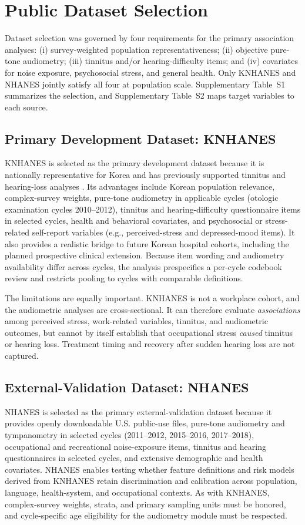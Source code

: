 \section{Public Dataset Selection}
Dataset selection was governed by four requirements for the primary association analyses: (i) survey-weighted population representativeness; (ii) objective pure-tone audiometry; (iii) tinnitus and/or hearing-difficulty items; and (iv) covariates for noise exposure, psychosocial stress, and general health. Only KNHANES and NHANES jointly satisfy all four at population scale. Supplementary Table~S1 summarizes the selection, and Supplementary Table~S2 maps target variables to each source.

\subsection{Primary Development Dataset: KNHANES}
KNHANES is selected as the primary development dataset because it is nationally representative for Korea and has previously supported tinnitus and hearing-loss analyses \citep{park2014tinnitus,joo2015hrqol}. Its advantages include Korean population relevance, complex-survey weights, pure-tone audiometry in applicable cycles (otologic examination cycles 2010--2012), tinnitus and hearing-difficulty questionnaire items in selected cycles, health and behavioral covariates, and psychosocial or stress-related self-report variables (e.g., perceived-stress and depressed-mood items). It also provides a realistic bridge to future Korean hospital cohorts, including the planned prospective clinical extension. Because item wording and audiometry availability differ across cycles, the analysis prespecifies a per-cycle codebook review and restricts pooling to cycles with comparable definitions.

The limitations are equally important. KNHANES is not a workplace cohort, and the audiometric analyses are cross-sectional. It can therefore evaluate \emph{associations} among perceived stress, work-related variables, tinnitus, and audiometric outcomes, but cannot by itself establish that occupational stress \emph{caused} tinnitus or hearing loss. Treatment timing and recovery after sudden hearing loss are not captured.

\subsection{External-Validation Dataset: NHANES}
NHANES is selected as the primary external-validation dataset because it provides openly downloadable U.S. public-use files, pure-tone audiometry and tympanometry in selected cycles (2011--2012, 2015--2016, 2017--2018), occupational and recreational noise-exposure items, tinnitus and hearing questionnaires in selected cycles, and extensive demographic and health covariates. NHANES enables testing whether feature definitions and risk models derived from KNHANES retain discrimination and calibration across population, language, health-system, and occupational contexts. As with KNHANES, complex-survey weights, strata, and primary sampling units must be honored, and cycle-specific age eligibility for the audiometry module must be respected.

